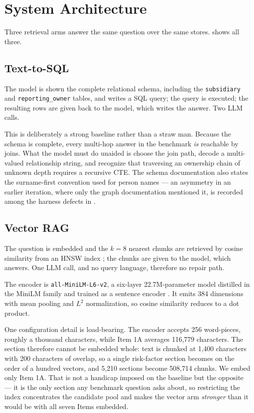 \section{System Architecture}
\label{sec:arch}

Three retrieval arms answer the same question over the same stores.
 shows all three.

\subsection{Text-to-SQL}

The model is shown the complete relational schema, including the
\texttt{subsidiary} and \texttt{reporting\_owner} tables, and writes a SQL query;
the query is executed; the resulting rows are given back to the model, which
writes the answer. Two LLM calls.

This is deliberately a strong baseline rather than a straw man. Because the schema
is complete, every multi-hop answer in the benchmark \emph{is} reachable by joins.
What the model must do unaided is choose the join path, decode a multi-valued
relationship string, and recognize that traversing an ownership chain of unknown
depth requires a recursive CTE. The schema documentation also states the
surname-first convention used for person names --- an asymmetry in an earlier
iteration, where only the graph documentation mentioned it, is recorded among the
harness defects in .

\subsection{Vector RAG}

The question is embedded and the $k{=}8$ nearest chunks are retrieved by cosine
similarity from an HNSW index \citep{malkov2018hnsw,pgvector2024}; the chunks are
given to the model, which answers. One LLM call, and no query language, therefore
no repair path.

The encoder is \texttt{all-MiniLM-L6-v2}, a six-layer 22.7M-parameter model
distilled in the MiniLM family \citep{wang2020minilm} and trained as a sentence
encoder \citep{reimers2019sbert}. It emits 384 dimensions with mean pooling and
$L^2$ normalization, so cosine similarity reduces to a dot product.

One configuration detail is load-bearing. The encoder accepts 256 word-pieces,
roughly a thousand characters, while Item 1A averages 116{,}779 characters. The
section therefore cannot be embedded whole: text is chunked at 1{,}400 characters
with 200 characters of overlap, so a single risk-factor section becomes on the
order of a hundred vectors, and 5{,}210 sections become 508{,}714 chunks. We
embed only Item 1A. That is not a handicap imposed on the baseline but the
opposite --- it is the only section any benchmark question asks about, so
restricting the index concentrates the candidate pool and makes the vector arm
\emph{stronger} than it would be with all seven Items embedded.

